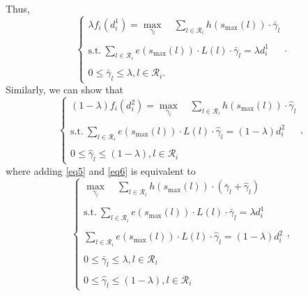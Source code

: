 \documentclass[journal]{IEEEtran}
\begin{document}
Thus,
\begin{equation}
\label{eq5}
\left\{\begin{array}{l}
\lambda f_i(d_i^1) = \underset{\gamma_l}{\max} \quad \sum\limits_{l \in \mathcal{R}_i} h\left(s_{\textrm{max}}(l)\right) \cdot  \bar{\gamma}_l\\
\\
{\text{s.t.}} ~
\sum\limits_{l \in \mathcal{R}_i} e(s_{\textrm{max}}(l)) \cdot L(l) \cdot \bar{\gamma}_l = \lambda d_i^1\\
\\
0 \leq \bar{\gamma}_l \leq \lambda, l \in \mathcal{R}_i.\end{array}\right. .
\end{equation}
Similarly, we can show that  
\begin{equation}
\label{eq6}
\left\{\begin{array}{l}
(1-\lambda) f_i(d_i^2) = \underset{\gamma_l}{\max} \quad \sum\limits_{l \in \mathcal{R}_i} h\left(s_{\textrm{max}}(l)\right) \cdot  \hat{\gamma}_l\\
\\
{\text{s.t.}} ~
\sum\limits_{l \in \mathcal{R}_i} e(s_{\textrm{max}}(l)) \cdot L(l) \cdot \hat{\gamma}_l = (1-\lambda) d_i^2\\
\\
0 \leq \hat{\gamma}_l \leq (1-\lambda), l \in \mathcal{R}_i\end{array}\right. ,
\end{equation}
where adding \eqref{eq5} and \eqref{eq6} is equivalent to
\begin{equation}
\left\{\begin{array}{l}
\underset{\gamma_l}{\max} \quad \sum\limits_{l \in \mathcal{R}_i} h\left(s_{\textrm{max}}(l)\right) \cdot  (\bar{\gamma}_l+\hat{\gamma}_l)\\
\\
{\text{s.t.}} ~
\sum\limits_{l \in \mathcal{R}_i} e(s_{\textrm{max}}(l)) \cdot L(l) \cdot \bar{\gamma}_l = \lambda d_i^1\\
\\
\sum\limits_{l \in \mathcal{R}_i} e(s_{\textrm{max}}(l)) \cdot L(l) \cdot \hat{\gamma}_l = (1-\lambda) d_i^2\\
\\
0 \leq \bar{\gamma}_l \leq \lambda, l \in \mathcal{R}_i\\
\\
0 \leq \hat{\gamma}_l \leq (1-\lambda), l \in \mathcal{R}_i\end{array}\right. ,
\end{equation}
\end{document}
